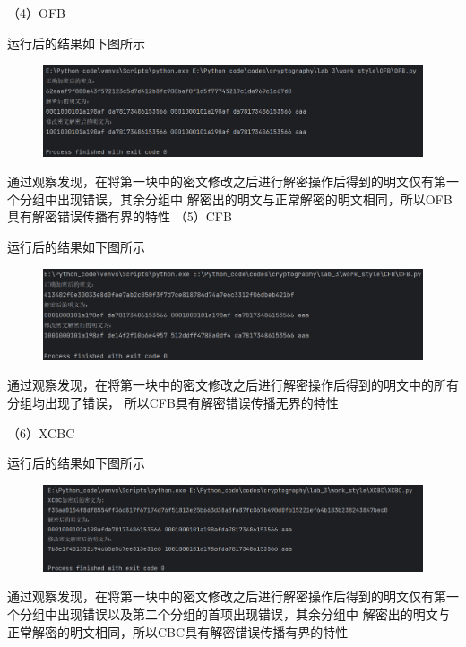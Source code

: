 \documentclass[a4paper,11pt,UTF8]{ctexart}
\newcommand{\bottomcaption}{%
\setlength{\abovecaptionskip}{6pt}%
\setlength{\belowcaptionskip}{6pt}%
\caption}
\newcommand{\xiaowuhao}{\fontsize{9pt}{\baselineskip}\selectfont}   %
\begin{document}
            （4）OFB\par
                运行后的结果如下图所示
                \begin{figure}[H]
                    \centering
                    \includegraphics[width=13cm]{OFB_result_3.png}
                    \bottomcaption{\xiaowuhao{OFB修改一位密文后两次加密结果}}
                \end{figure}
                通过观察发现，在将第一块中的密文修改之后进行解密操作后得到的明文仅有第一个分组中出现错误，其余分组中
                解密出的明文与正常解密的明文相同，所以OFB具有解密错误传播有界的特性
\newpage
            （5）CFB\par
                运行后的结果如下图所示
                \begin{figure}[H]
                    \centering
                    \includegraphics[width=13cm]{CFB_result_3.png}
                    \bottomcaption{\xiaowuhao{CFB修改一位密文后两次加密结果}}
                \end{figure}
                通过观察发现，在将第一块中的密文修改之后进行解密操作后得到的明文中的所有分组均出现了错误，
                所以CFB具有解密错误传播无界的特性

            （6）XCBC\par
                运行后的结果如下图所示
                \begin{figure}[H]
                    \centering
                    \includegraphics[width=13cm]{XCBC_result_3.png}
                    \bottomcaption{\xiaowuhao{XCBC修改一位密文后两次加密结果}}
                \end{figure}
                通过观察发现，在将第一块中的密文修改之后进行解密操作后得到的明文仅有第一个分组中出现错误以及第二个分组的首项出现错误，其余分组中
                解密出的明文与正常解密的明文相同，所以CBC具有解密错误传播有界的特性
\end{document}
